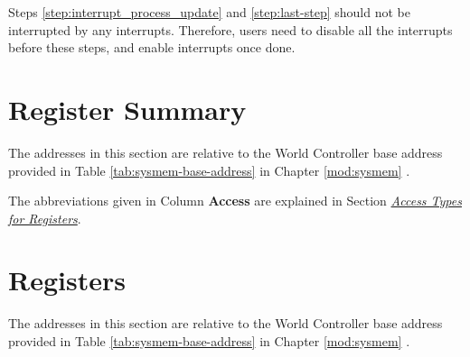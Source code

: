 \documentclass[main\_\_EN.tex]{subfiles}
\begin{document}
\begin{tiplisting}
Steps \ref{step:interrupt_process_update} and \ref{step:last-step} should not be interrupted by any interrupts. Therefore, users need to disable all the interrupts before these steps, and enable interrupts once done.
\end{tiplisting}






\clearpage

\section{Register Summary}\hypertarget{wctrl-reg-summ}{}
The addresses in this section are relative to the World Controller base address provided in Table \ref{tab:sysmem-base-address} in Chapter \ref{mod:sysmem} \textit{}.

The abbreviations given in Column \textbf{Access} are explained in Section \hyperref[glossary-access-types]{\textit{Access Types for Registers}}.






\clearpage

\section{Registers}

The addresses in this section are relative to the World Controller base address provided in Table \ref{tab:sysmem-base-address} in Chapter \ref{mod:sysmem} \textit{}.




\end{document}
